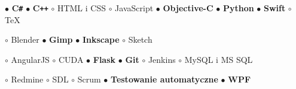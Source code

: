 \documentclass[11pt,a4paper]{article}
\begin{document}
    \bigskip

  
  
    \smallskip


    \smallskip
    $\bullet$ {\bf C\texttt{\#}}
    \hspace{0.34cm}
    $\bullet$ {\bf C\texttt{++}}
    \hspace{0.34cm}
    $\circ$ HTML i CSS
    \hspace{0.34cm}
    $\circ$ JavaScript
    \hspace{0.34cm}
    $\bullet$ {\bf Objective-C}
    \hspace{0.34cm}
    $\bullet$ {\bf Python}
    \hspace{0.34cm}
    $\bullet$ {\bf Swift}
    \hspace{0.34cm}
    $\circ$ TeX


    \smallskip


    \smallskip
    $\circ$ Blender
    \hspace{0.34cm}
    $\bullet$ {\bf Gimp}
    \hspace{0.34cm}
    $\bullet$ {\bf Inkscape}
    \hspace{0.34cm}
    $\circ$ Sketch


    \smallskip


    \smallskip
    $\circ$ AngularJS
    \hspace{0.34cm}
    $\circ$ CUDA
    \hspace{0.34cm}
    $\bullet$ {\bf Flask}
    \hspace{0.34cm}
    $\bullet$ {\bf Git}
    \hspace{0.34cm}
    $\circ$ Jenkins
    \hspace{0.34cm}
    $\circ$ MySQL i MS SQL

    \vspace{0.04cm}
    $\circ$ Redmine
    \hspace{0.34cm}
    $\circ$ SDL
    \hspace{0.34cm}
    $\circ$ Scrum
    \hspace{0.34cm}
    $\bullet$ {\bf Testowanie automatyczne}
    \hspace{0.34cm}
    $\bullet$ {\bf WPF}
  
\end{document}
